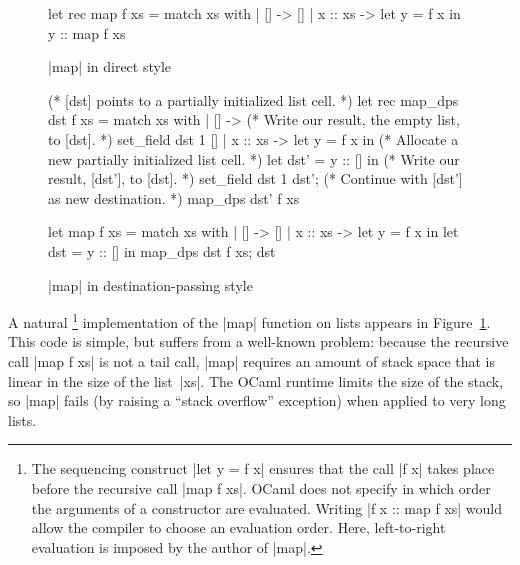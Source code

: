 \newcommand{\captionlabel}[2]{\caption{#1}\label{#2}}
\newcommand{\fref}[1]{Figure~\ref{#1}}

\begin{figure}[tp]
\begin{OCaml}
let rec map f xs =
  match xs with
  | [] -> []
  | x :: xs ->
      let y = f x in y :: map f xs
\end{OCaml}
\captionlabel{\ocaml|map| in direct style}{fig:map}
\end{figure}

\begin{figure}[tp]
\begin{OCaml}
(* [dst] points to a partially initialized list cell. *)
let rec map_dps dst f xs =
  match xs with
  | [] ->
      (* Write our result, the empty list, to [dst]. *)
      set_field dst 1 []
  | x :: xs ->
      let y = f x in
      (* Allocate a new partially initialized list cell. *)
      let dst' = y :: [] in
      (* Write our result, [dst'], to [dst]. *)
      set_field dst 1 dst';
      (* Continue with [dst'] as new destination. *)
      map_dps dst' f xs

let map f xs =
  match xs with
  | [] -> []
  | x :: xs ->
      let y = f x in
      let dst = y :: [] in
      map_dps dst f xs;
      dst
\end{OCaml}
\captionlabel{\ocaml|map| in destination-passing style}{fig:map_dps}
\end{figure}

A natural%
%
\footnote{The sequencing construct \ocaml|let y = f x| ensures that the call \ocaml|f x| takes place before the recursive call \ocaml|map f xs|. OCaml does not specify in which order the arguments of a constructor are evaluated. Writing \ocaml|f x :: map f xs| would allow the compiler to choose an evaluation order.  Here, left-to-right evaluation is imposed by the author of \ocaml|map|.}
%
implementation of the \ocaml|map| function on lists appears in \fref{fig:map}.
%
This code is simple, but suffers from a well-known problem: because the recursive call \ocaml|map f xs| is not a tail call, \ocaml|map| requires an amount of stack space that is linear in the size of the list~\ocaml|xs|.
%
The OCaml runtime limits the size of the stack, so \ocaml|map| fails (by raising a ``stack overflow'' exception) when applied to very long lists.

